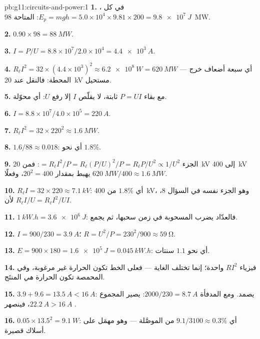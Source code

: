 \begin{solution}{pb:g11:circuits-and-power:1}
\textbf{1.} في كل ، $E_p = mgh = 5.0\times10^{4} \times 9.81 \times
200 = \qty{9.8e7}{J}$:  المتاحة \qty{98}{MW}.

\textbf{2.} $0.90 \times 98 = \qty{88}{MW}$.

\textbf{3.} $I = P/U = 8.8\times10^{7}/2.0\times10^{4} = \qty{4.4e3}{A}$.

\textbf{4.} $R_\ell I^2 = 32 \times (4.4\times10^{3})^2 \approx
\qty{6.2e8}{W} = \qty{620}{MW}$ --- أي سبعة أضعاف خرج المحطة:
فالنقل عند \qty{20}{kV} مستحيل.

\textbf{5.} مع بقاء $P = UI$ ثابتة، لا يقلّص $I$ إلا رفع $U$: أي
محوّلة.

\textbf{6.} $I = 8.8\times10^{7}/4.0\times10^{5} = \qty{220}{A}$.

\textbf{7.} $R_\ell I^2 = 32 \times 220^2 \approx \qty{1.6}{MW}$.

\textbf{8.} $1.6/88 \approx 0.018$: أي نحو $1.8\%$.

\textbf{9.} الجزء $= R_\ell I^2/P = R_\ell (P/U)^2/P = R_\ell P/U^2
\propto 1/U^2$: فمن \qty{20}{kV} إلى \qty{400}{kV} يهبط بمقدار
$20^2 = 400$، وفعلًا $\qty{620}{MW}/400 \approx \qty{1.6}{MW}$.

\textbf{10.} $R_\ell I = 32 \times 220 \approx \qty{7.1}{kV}$: أي $1.8\%$
من \qty{400}{kV}، وهو الجزء نفسه في السؤال 8، لأن
$R_\ell I/U = R_\ell I^2/UI$.

\textbf{11.} $\qty{1}{kW.h} = \qty{3.6e6}{J}$: فالعدّاد يضرب
 المسحوبة في زمن سحبها، ثم يجمع.

\textbf{12.} $I = 900/230 = \qty{3.9}{A}$؛
$R = U^2/P = 230^2/900 \approx \qty{59}{\ohm}$.

\textbf{13.} $E = 900 \times 180 = \qty{1.6e5}{J} = \qty{0.045}{kW.h}$:
أي نحو $1.1$ سنتات.

\textbf{14.} فيزياء $RI^2$ واحدة؛ إنما تختلف الغاية
--- فعلى الخط تكون الحرارة غير مرغوبة، وفي المحمصة تكون الحرارة
\emph{هي} المنتَج.

\textbf{15.} $3.9 + 9.6 = \qty{13.5}{A} < \qty{16}{A}$: يصمد. ومع المدفأة
$2000/230 = \qty{8.7}{A}$: يصير المجموع $\qty{22.2}{A} > \qty{16}{A}$، فينصهر
.

\textbf{16.} $0.05 \times 13.5^2 = \qty{9.1}{W}$: أي $9.1/3100 \approx
0.3\%$ من  الموصَّلة --- وهو مهمَل على أسلاك قصيرة.


\end{solution}
